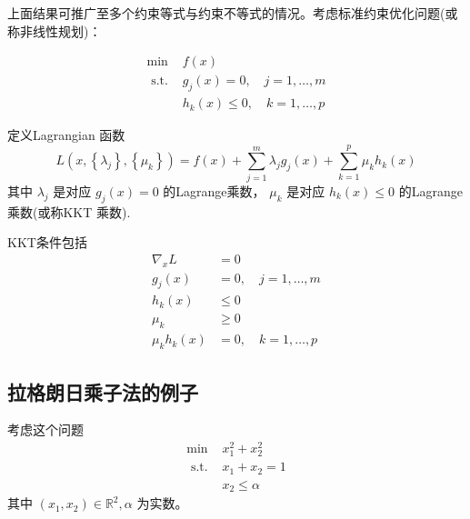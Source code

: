 上面结果可推广至多个约束等式与约束不等式的情况。考虑标准约束优化问题(或称非线性规划)：

\begin{definition}
    \begin{equation}
\begin{array}{ll}
\min & f({x}) \\
\text { s.t. } & g_{j}({x})=0, \quad j=1, \ldots, m \\
& h_{k}({x}) \leq 0, \quad k=1, \ldots, p
\end{array}
\end{equation}
\end{definition}

\begin{theorem}[标准约束优化的KKT条件]
    定义Lagrangian 函数
\begin{equation}
L\left({x},\left\{\lambda_{j}\right\},\left\{\mu_{k}\right\}\right)=f({x})+\sum_{j=1}^{m} \lambda_{j} g_{j}({x})+\sum_{k=1}^{p} \mu_{k} h_{k}({x})
\end{equation}
其中 $ \lambda_{j} $ 是对应 $ g_{j}({x})=0 $ 的Lagrange乘数， $ \mu_{k} $ 是对应 $ h_{k}({x}) \leq 0 $ 的Lagrange乘数(或称KKT 乘数). 

KKT条件包括
\begin{equation}
\begin{aligned}
\nabla_{{x}} L &={0} \\
g_{j}({x}) &=0, \quad j=1, \ldots, m \\
h_{k}({x}) & \leq 0 \\
\mu_{k} & \geq 0 \\
\mu_{k} h_{k}({x}) &=0, \quad k=1, \ldots, p
\end{aligned}
\end{equation}

\end{theorem}

\subsection{拉格朗日乘子法的例子}

\begin{problem}

    考虑这个问题
\begin{equation}
\begin{array}{ll}
\min & x_{1}^{2}+x_{2}^{2} \\
\text { s.t. } & x_{1}+x_{2}=1 \\
& x_{2} \leq \alpha
\end{array}
\end{equation}
其中 $ \left(x_{1}, x_{2}\right) \in \mathbb{R}^{2}, \alpha $ 为实数。
\end{problem}

